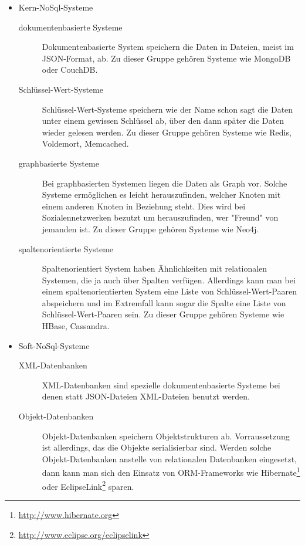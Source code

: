 \begin{itemize}
    \item Kern-NoSql-Systeme
        \begin{description}
            \item[dokumentenbasierte Systeme] Dokumentenbasierte System
                speichern die Daten in Dateien, meist im \gls{JSON}-Format, ab.
                Zu dieser Gruppe gehören Systeme wie MongoDB oder CouchDB.
            \item[Schlüssel-Wert-Systeme] Schlüssel-Wert-Systeme speichern wie
                der Name schon sagt die Daten unter einem gewissen Schlüssel ab,
                über den dann später die Daten wieder gelesen werden. Zu dieser
                Gruppe gehören Systeme wie Redis, Voldemort, Memcached.
            \item[graphbasierte Systeme] Bei graphbasierten Systemen liegen die
                Daten als Graph vor. Solche Systeme ermöglichen es leicht
                herauszufinden, welcher Knoten mit einem anderen Knoten in
                Beziehung steht. Dies wird bei Sozialennetzwerken bezutzt um
                herauszufinden, wer "Freund" von jemanden ist. Zu dieser Gruppe
                gehören Systeme wie Neo4j.
            \item[spaltenorientierte Systeme] Spaltenorientiert System haben
                Ähnlichkeiten mit relationalen Systemen, die ja auch über
                Spalten verfügen. Allerdings kann man bei einem
                spaltenorientierten System eine Liste von Schlüssel-Wert-Paaren
                abspeichern und im Extremfall kann sogar die Spalte eine Liste
                von Schlüssel-Wert-Paaren sein. Zu dieser Gruppe gehören Systeme
                wie HBase, Cassandra.
        \end{description}
    \item Soft-NoSql-Systeme
        \begin{description}
            \item[XML-Datenbanken] XML-Datenbanken sind spezielle
                dokumentenbasierte Systeme bei denen statt \gls{JSON}-Dateien
                \gls{XML}-Dateien benutzt werden.
            \item[Objekt-Datenbanken] Objekt-Datenbanken speichern
                Objektstrukturen ab. Vorraussetzung ist allerdings, das die
                Objekte serialisierbar sind. Werden solche Objekt-Datenbanken
                anstelle von relationalen Datenbanken eingesetzt, dann kann man
                sich den Einsatz von \gls{ORM}-Frameworks wie
                Hibernate\footnote{\url{http://www.hibernate.org}}
                oder EclipseLink\footnote{\url{http://www.eclipse.org/eclipselink}}
                sparen.
        \end{description}
\end{itemize}

